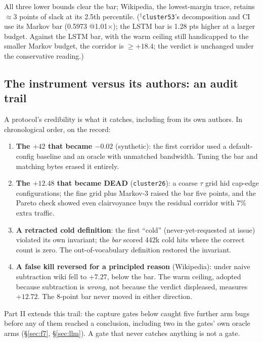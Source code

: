\documentclass[11pt]{article}
\newcommand{\x}{$\times$}
\begin{document}
All three lower bounds clear the bar; Wikipedia, the lowest-margin trace, retains $\approx3$ points of slack at its 2.5th percentile. ($^{\dagger}$\texttt{cluster53}'s decomposition and CI use its Markov bar (0.5973 @1.01\x); the LSTM bar is 1.28 pts higher at a larger budget. Against the LSTM bar, with the warm ceiling still handicapped to the smaller Markov budget, the corridor is $\geq +18.4$; the verdict is unchanged under the conservative reading.)

\subsection{The instrument versus its authors: an audit trail}\label{sec:audit}
A protocol's credibility is what it catches, including from its own authors. In chronological order, on the record:
\begin{enumerate}\itemsep0.1em
\item \textbf{The $+42$ that became $-0.02$} (synthetic): the first corridor used a default-config baseline and an oracle with unmatched bandwidth. Tuning the bar and matching bytes erased it entirely.
\item \textbf{The $+12.48$ that became DEAD} (\texttt{cluster26}): a coarse $\tau$ grid hid cap-edge configurations; the fine grid plus Markov-3 raised the bar five points, and the Pareto check showed even clairvoyance buys the residual corridor with 7\% extra traffic.
\item \textbf{A retracted cold definition}: the first ``cold'' (never-yet-requested at issue) violated its own invariant; the \emph{bar} scored 442k cold hits where the correct count is zero. The out-of-vocabulary definition restored the invariant.
\item \textbf{A false kill reversed for a principled reason} (Wikipedia): under naive subtraction wiki fell to $+7.27$, below the bar. The warm ceiling, adopted because subtraction is \emph{wrong}, not because the verdict displeased, measures $+12.72$. The 8-point bar never moved in either direction.
\end{enumerate}
Part II extends this trail: the capture gates below caught five further arm bugs before any of them reached a conclusion, including two in the gates' own oracle arms (\S\ref{sec:f7}, \S\ref{sec:llm}). A gate that never catches anything is not a gate.
\end{document}
